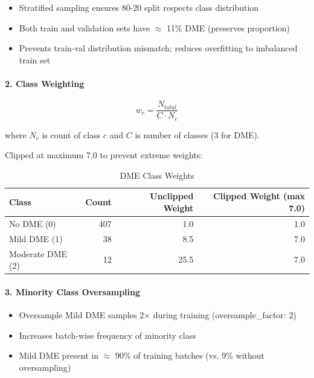 \documentclass[12pt,a4paper]{article}
\begin{document}
\begin{itemize}
    \item Stratified sampling ensures 80-20 split respects class distribution
    \item Both train and validation sets have $\approx$ 11\% DME (preserves proportion)
    \item Prevents train-val distribution mismatch; reduces overfitting to imbalanced train set
\end{itemize}

\paragraph{2. Class Weighting}

\begin{equation}
w_c = \frac{N_{total}}{C \cdot N_c}
\end{equation}

where $N_c$ is count of class $c$ and $C$ is number of classes (3 for DME).

Clipped at maximum 7.0 to prevent extreme weights:

\begin{table}[H]
\centering
\small
\caption{DME Class Weights}
\begin{tabular}{|l|r|r|r|}
\hline
\textbf{Class} & \textbf{Count} & \textbf{Unclipped Weight} & \textbf{Clipped Weight (max 7.0)} \\
\hline
No DME (0) & 407 & 1.0 & 1.0 \\
Mild DME (1) & 38 & 8.5 & 7.0 \\
Moderate DME (2) & 12 & 25.5 & 7.0 \\
\hline
\end{tabular}
\end{table}

\paragraph{3. Minority Class Oversampling}

\begin{itemize}
    \item Oversample Mild DME samples 2× during training (oversample\_factor: 2)
    \item Increases batch-wise frequency of minority class
    \item Mild DME present in $\approx$ 90\% of training batches (vs. 9\% without oversampling)
\end{itemize}
\end{document}
